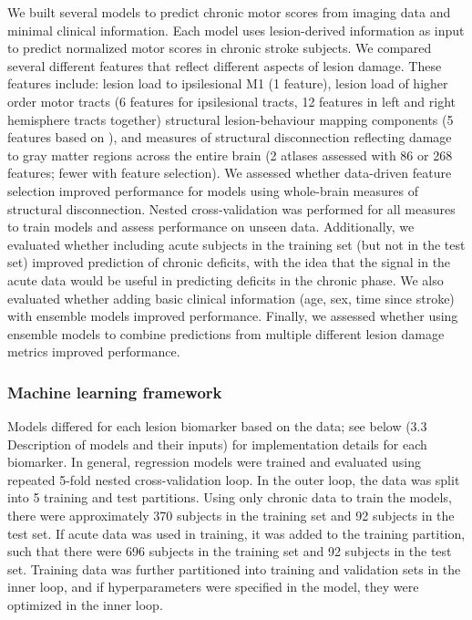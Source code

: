 \documentclass[phd,tocprelim]{cornell}
\begin{document}
We built several models to predict chronic motor scores from imaging data and minimal clinical information. Each model uses lesion-derived information as input to predict normalized motor scores in chronic stroke subjects. We compared several different features that reflect different aspects of lesion damage. These features include: lesion load to ipsilesional M1 (1 feature), lesion load of higher order motor tracts (6 features for ipsilesional tracts, 12 features in left and right hemisphere tracts together) structural lesion-behaviour mapping components (5 features based on \cite{Bowren2022-rs}), and measures of structural disconnection reflecting damage to gray matter regions across the entire brain (2 atlases assessed with 86 or 268 features; fewer with feature selection). We assessed whether data-driven feature selection improved performance for models using whole-brain measures of structural disconnection. Nested cross-validation was performed for all measures to train models and assess performance on unseen data.  Additionally, we evaluated whether including acute subjects in the training set (but not in the test set) improved prediction of chronic deficits, with the idea that the signal in the acute data would be useful in predicting deficits in the chronic phase. We also evaluated whether adding basic clinical information (age, sex, time since stroke) with ensemble models improved performance. Finally, we assessed whether using ensemble models to combine predictions from multiple different lesion damage metrics improved performance.

\subsubsection*{Machine learning framework}
Models differed for each lesion biomarker based on the data; see below (3.3 Description of models and their inputs) for implementation details for each biomarker. In general, regression models were trained and evaluated using repeated 5-fold nested cross-validation loop.  In the outer loop, the data was split into 5 training and test partitions. Using only chronic data to train the models, there were approximately 370 subjects in the training set and 92 subjects in the test set. If acute data was used in training, it was added to the training partition, such that there were 696 subjects in the training set and 92 subjects in the test set. Training data was further partitioned into training and validation sets in the inner loop, and if hyperparameters were specified in the model, they were optimized in the inner loop. 
\end{document}
